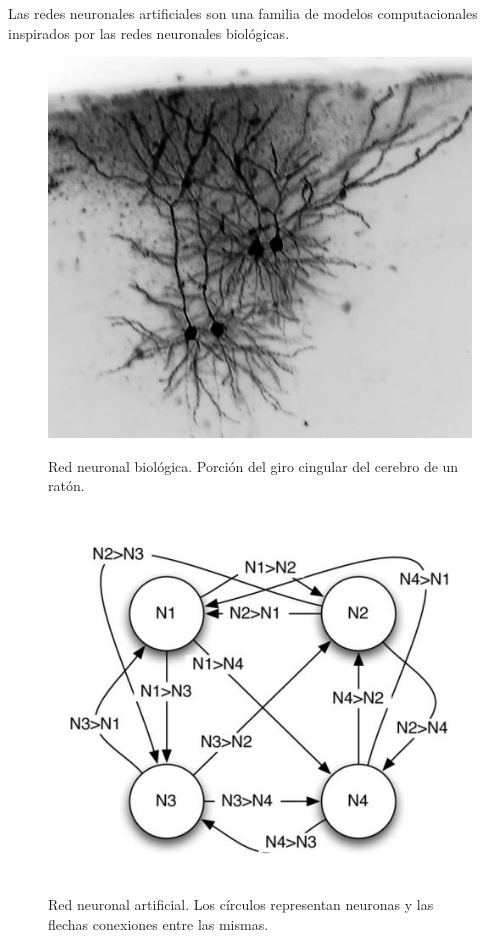 Las redes neuronales artificiales son una familia de modelos computacionales inspirados por las redes neuronales biológicas.


\begin{figure}[ht]
\centering
\begin{minipage}[b]{0.40\linewidth}
\centering
\includegraphics[width=\textwidth]{img/neuronales/biological_mouse}
\caption{Red neuronal biológica. Porción del giro cingular del cerebro de un ratón.}
\label{fig:biological}
\end{minipage}
\hspace{0.5cm}
\begin{minipage}[b]{0.40\linewidth}
\centering
\includegraphics[width=\textwidth]{img/neuronales/artificial}
\caption{Red neuronal artificial. Los círculos representan neuronas y las flechas conexiones entre las mismas.}
\label{fig:artificial}
\end{minipage}
\end{figure}


